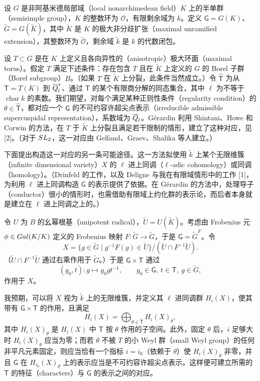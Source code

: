 设 $G$ 是非阿基米德局部域（local nonarchimedean field）$K$ 上的半单群（semisimple group），$K$ 的整数环为 $\mathcal O$，有限剩余域为 $k$。定义 $\mathsf G=G(K)$、$\widetilde G=G(\widetilde K)$，其中 $\widetilde K$ 是 $K$ 的极大非分歧扩张（maximal unramified extension），其整数环为 $\widetilde{\mathcal O}$，剩余域 $\widetilde k$ 是 $k$ 的代数闭包。

设 $T\subset G$ 是在 $K$ 上定义且各向异性的（anisotropic）极大环面（maximal torus）。假定 $T$ 满足下述条件：存在包含 $T$ 且在 $\widetilde K$ 上定义的 $G$ 的 Borel 子群（Borel subgroup）$B$。（如果 $T$ 在 $\widetilde K$ 上分裂，此条件当然成立。）令 $\widehat{\mathsf T}$ 为从 $\mathsf T=T(K)$ 到 $\overline{Q}_l^*$、通过 $\mathsf T$ 的某个有限商分解的同态集合，其中 $\ell$ 为不等于 $\operatorname{char}k$ 的素数。我们期望，对每个满足某种正则性条件（regularity condition）的 $\theta\in\widehat{\mathsf T}$，都对应一个 $\mathsf G$ 的不可约容许超尖点表示（irreducible admissible supercuspidal representation），系数域为 $\overline{Q}_l$。Gérardin 利用 Shintani、Howe 和 Corwin 的方法，在 $T$ 于 $\widetilde K$ 上分裂且满足若干限制的情形，建立了这种对应，见 [2]。（对于 $SL_2$，这一对应由 Gelfand、Graev、Shalika 等人建立。）

下面提出构造这一对应的另一条可能途径。这一方法拟使用 $\widetilde k$ 上某个无限维簇（infinite dimensional variety）$X$ 的 $\ell$ 进上同调（$\ell$-adic cohomology）或同调（homology）。（Drinfeld 的工作，以及 Deligne 与我在有限域情形中的工作 [1]，为利用 $\ell$ 进上同调构造 $\mathsf G$ 的表示提供了依据。在 Gérardin 的方法中，处理导子（conductor）很小的情形时，也需借助有限域上约化群的表示论，而后者本身就是建立在 $\ell$ 进上同调之上的。）

令 $U$ 为 $B$ 的幺幂根基（unipotent radical），$\widetilde U=U(\widetilde K)$。考虑由 Frobenius 元 $\phi\in Gal(K/K)$ 定义的 Frobenius 映射 $F:\widetilde G\to\widetilde G$，于是 $\mathsf G=\widetilde G^F$。令
\[
X=\{g\in\widetilde G\mid g^{-1}F(g)\in\widetilde U\}/(\widetilde U\cap F^{-1}\widetilde U).
\]
（$\widetilde U\cap F^{-1}\widetilde U$ 通过右乘作用于 $\widetilde G$。）于是 $\mathsf G\times\mathsf T$ 通过
\[
(g_0,t):g\longmapsto g_0gt^{-1},\qquad g_0\in\mathsf G,\ t\in\mathsf T,\ g\in\widetilde G,
\]
作用于 $X$。

我预期，可以将 $X$ 视为 $\widetilde k$ 上的无限维簇，并定义其 $\ell$ 进同调群 $H_i(X)$，使其带有 $\mathsf G\times\mathsf T$ 的作用，且满足
\[
H_i(X)=\bigoplus_{\theta\in\widehat{\mathsf T}}H_i(X)_\theta,
\]
其中 $H_i(X)_\theta$ 是 $H_i(X)$ 中 $\mathsf T$ 按 $\theta$ 作用的子空间。此外，固定 $\theta$ 后，$i$ 足够大时 $H_i(X)_\theta$ 应当为零；而若 $\theta$ 不被 $T$ 的小 Weyl 群（small Weyl group）的任何非平凡元素固定，则应当恰有一个指标 $i=i_0$（依赖于 $\theta$）使 $H_i(X)_\theta$ 非零，并且 $\mathsf G$ 在 $H_{i_0}(X)_\theta$ 上的表示应当是不可约容许超尖点表示。这样便可建立所需的 $\mathsf T$ 的特征（characters）与 $\mathsf G$ 的表示之间的对应。

